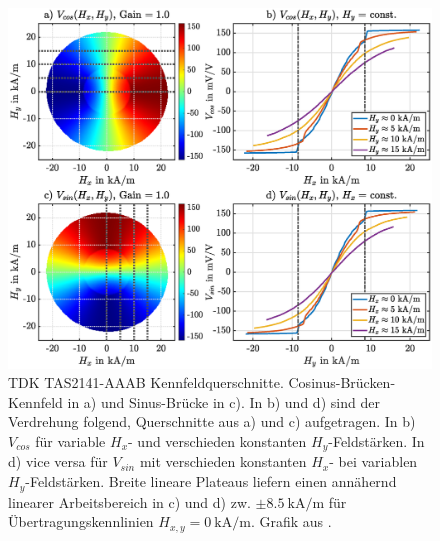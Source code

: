 \begin{figure}[tph]
	\centering
	\includegraphics[width=.95\linewidth]{appendix/images/3-TDK/TDK_Kennfeld_Steigend}
	\caption[TDK TAS2141-AAAB Kennfeldquerschnitte]{TDK TAS2141-AAAB Kennfeldquerschnitte. Cosinus-Brücken-Kennfeld in 
	a) und Sinus-Brücke in c). In b) und d) sind der Verdrehung folgend, Querschnitte aus a) und c) aufgetragen. In b) 
	$V_{cos}$ für variable $H_x$- und verschieden konstanten $H_y$-Feldstärken. In d) vice versa für $V_{sin}$ mit 
	verschieden konstanten $H_x$- bei variablen $H_y$-Feldstärken. Breite lineare Plateaus liefern einen annähernd linearer 
	Arbeitsbereich in c) und d) zw. $\pm\SI{8,5}{\kilo\ampere\per\metre}$ für Übertragungskennlinien $H_{x,y} = 
	\SI{0}{\kilo\ampere\per\metre}$. Grafik aus \cite{Schuethe2019}.}
	\label{fig:tdkkennfeldsteigend}
\end{figure}
